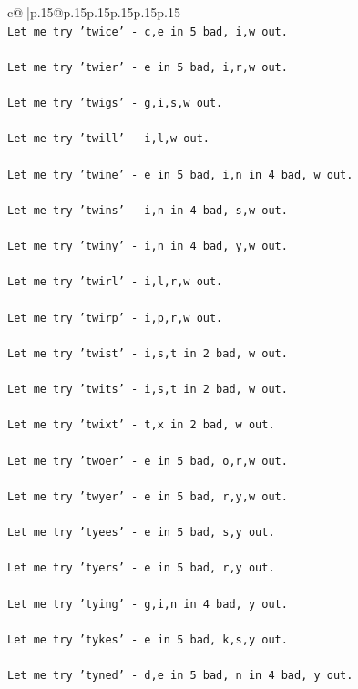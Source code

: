 \documentclass{article}
\begin{document}
{\begin{supertabular}{c@{$\;$}|p{.15\linewidth}@{}p{.15\linewidth}p{.15\linewidth}p{.15\linewidth}p{.15\linewidth}p{.15\linewidth}}
{{{\\ 
\texttt{Let me try 'twice' {-} c,e in 5 bad, i,w out. } \\
\\ 
\texttt{Let me try 'twier' {-} e in 5 bad, i,r,w out. } \\
\\ 
\texttt{Let me try 'twigs' {-} g,i,s,w out. } \\
\\ 
\texttt{Let me try 'twill' {-} i,l,w out. } \\
\\ 
\texttt{Let me try 'twine' {-} e in 5 bad, i,n in 4 bad, w out. } \\
\\ 
\texttt{Let me try 'twins' {-} i,n in 4 bad, s,w out. } \\
\\ 
\texttt{Let me try 'twiny' {-} i,n in 4 bad, y,w out. } \\
\\ 
\texttt{Let me try 'twirl' {-} i,l,r,w out. } \\
\\ 
\texttt{Let me try 'twirp' {-} i,p,r,w out. } \\
\\ 
\texttt{Let me try 'twist' {-} i,s,t in 2 bad, w out. } \\
\\ 
\texttt{Let me try 'twits' {-} i,s,t in 2 bad, w out. } \\
\\ 
\texttt{Let me try 'twixt' {-} t,x in 2 bad, w out. } \\
\\ 
\texttt{Let me try 'twoer' {-} e in 5 bad, o,r,w out. } \\
\\ 
\texttt{Let me try 'twyer' {-} e in 5 bad, r,y,w out. } \\
\\ 
\texttt{Let me try 'tyees' {-} e in 5 bad, s,y out. } \\
\\ 
\texttt{Let me try 'tyers' {-} e in 5 bad, r,y out. } \\
\\ 
\texttt{Let me try 'tying' {-} g,i,n in 4 bad, y out. } \\
\\ 
\texttt{Let me try 'tykes' {-} e in 5 bad, k,s,y out. } \\
\\ 
\texttt{Let me try 'tyned' {-} d,e in 5 bad, n in 4 bad, y out. } \\
}}}
\end{supertabular}}
\end{document}
